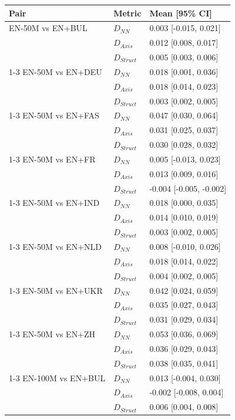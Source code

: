 \begin{tabular}{@{}lll@{}}
\toprule
Pair & Metric & Mean [95\% CI] \\
\midrule
EN-50M vs EN+BUL & $D_{NN}$ & 0.003 [-0.015, 0.021] \\
 & $D_{Axis}$ & 0.012 [0.008, 0.017] \\
 & $D_{Struct}$ & 0.005 [0.003, 0.006] \\
\cmidrule(lr){1-3}
EN-50M vs EN+DEU & $D_{NN}$ & 0.018 [0.001, 0.036] \\
 & $D_{Axis}$ & 0.018 [0.014, 0.023] \\
 & $D_{Struct}$ & 0.003 [0.002, 0.005] \\
\cmidrule(lr){1-3}
EN-50M vs EN+FAS & $D_{NN}$ & 0.047 [0.030, 0.064] \\
 & $D_{Axis}$ & 0.031 [0.025, 0.037] \\
 & $D_{Struct}$ & 0.030 [0.028, 0.032] \\
\cmidrule(lr){1-3}
EN-50M vs EN+FR & $D_{NN}$ & 0.005 [-0.013, 0.023] \\
 & $D_{Axis}$ & 0.013 [0.009, 0.016] \\
 & $D_{Struct}$ & -0.004 [-0.005, -0.002] \\
\cmidrule(lr){1-3}
EN-50M vs EN+IND & $D_{NN}$ & 0.018 [0.000, 0.035] \\
 & $D_{Axis}$ & 0.014 [0.010, 0.019] \\
 & $D_{Struct}$ & 0.003 [0.002, 0.005] \\
\cmidrule(lr){1-3}
EN-50M vs EN+NLD & $D_{NN}$ & 0.008 [-0.010, 0.026] \\
 & $D_{Axis}$ & 0.018 [0.014, 0.022] \\
 & $D_{Struct}$ & 0.004 [0.002, 0.005] \\
\cmidrule(lr){1-3}
EN-50M vs EN+UKR & $D_{NN}$ & 0.042 [0.024, 0.059] \\
 & $D_{Axis}$ & 0.035 [0.027, 0.043] \\
 & $D_{Struct}$ & 0.031 [0.029, 0.034] \\
\cmidrule(lr){1-3}
EN-50M vs EN+ZH & $D_{NN}$ & 0.053 [0.036, 0.069] \\
 & $D_{Axis}$ & 0.036 [0.029, 0.043] \\
 & $D_{Struct}$ & 0.038 [0.035, 0.041] \\
\cmidrule(lr){1-3}
EN-100M vs EN+BUL & $D_{NN}$ & 0.013 [-0.004, 0.030] \\
 & $D_{Axis}$ & -0.002 [-0.008, 0.004] \\
 & $D_{Struct}$ & 0.006 [0.004, 0.008] \\

\end{tabular}
